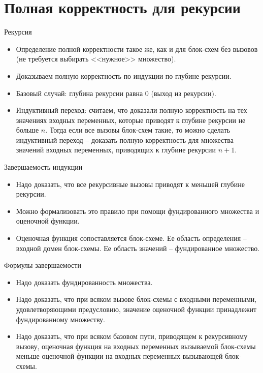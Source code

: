 \documentclass[hyperref={unicode=true}]{beamer}
\begin{document}
    \section{Полная корректность для рекурсии}

    \begin{frame}{Рекурсия}
    \begin{itemize}
    \item Определение полной корректности такое же, как и для блок-схем
            без вызовов (не требуется выбирать <<нужное>> множество).
    \item Доказываем полную корректность по индукции по глубине рекурсии.
    \item Базовый случай: глубина рекурсии равна 0 (выход из рекурсии).
    \item Индуктивный переход: считаем, что доказали полную корректность
    на тех значениях входных переменных, которые приводят к глубине рекурсии
    не больше $n$. Тогда если все вызовы блок-схем такие, то можно
    сделать индуктивный переход -- доказать полную корректность
    для множества значений входных переменных, приводящих к глубине рекурсии
    $n + 1$.
    \end{itemize}
    \end{frame}

    \begin{frame}{Завершаемость индукции}
    \begin{itemize}
    \item Надо доказать, что все рекурсивные вызовы приводят к
            меньшей глубине рекурсии.
    \item Можно формализовать это правило при помощи фундированного множества
            и оценочной функции.
    \item Оценочная функция сопоставляется блок-схеме. Ее область определения
            -- входной домен блок-схемы. Ее область значений -- фундированное
            множество.
    \end{itemize}
    \end{frame}

    \begin{frame}{Формулы завершаемости}
    \begin{itemize}
    \item Надо доказать фундированность множества.
    \item Надо доказать, что при всяком вызове блок-схемы
            с входными переменными, удовлетворяющими предусловию,
            значение оценочной функции принадлежит фундированному множеству.
    \item Надо доказать, что при всяком базовом пути, приводящем к
            рекурсивному вызову, оценочная функция на входных переменных
            вызываемой блок-схемы меньше оценочной функции на входных
            переменных вызывающей блок-схемы.
    \end{itemize}
    \end{frame}
\end{document}
